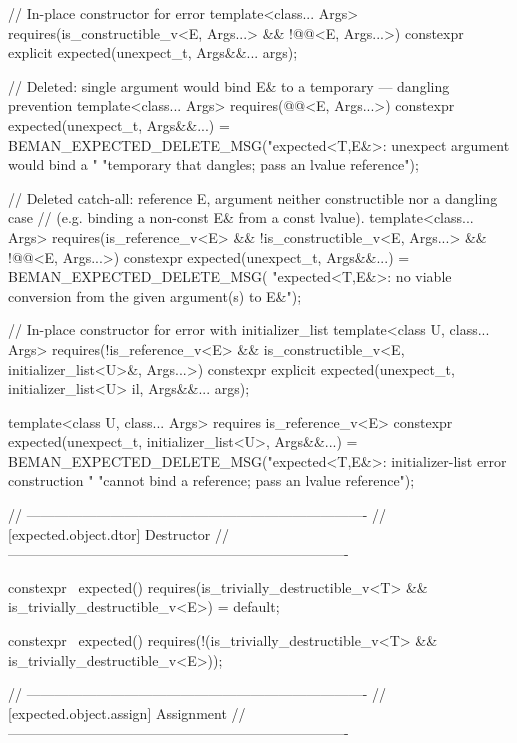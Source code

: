 \begin{codeblock}
{{    // In-place constructor for error
    template<class... Args>
      requires(is_constructible_v<E, Args...> && !@@<E, Args...>)
    constexpr explicit expected(unexpect_t, Args&&... args);

    // Deleted: single argument would bind E& to a temporary — dangling prevention
    template<class... Args>
      requires(@@<E, Args...>)
    constexpr expected(unexpect_t, Args&&...) =
        BEMAN_EXPECTED_DELETE_MSG("expected<T,E&>: unexpect argument would bind a "
                                  "temporary that dangles; pass an lvalue reference");

    // Deleted catch-all: reference E, argument neither constructible nor a dangling case
    // (e.g. binding a non-const E& from a const lvalue).
    template<class... Args>
      requires(is_reference_v<E> && !is_constructible_v<E, Args...> &&
               !@@<E, Args...>)
    constexpr expected(unexpect_t, Args&&...) = BEMAN_EXPECTED_DELETE_MSG(
        "expected<T,E&>: no viable conversion from the given argument(s) to E&");

    // In-place constructor for error with initializer_list
    template<class U, class... Args>
      requires(!is_reference_v<E> && is_constructible_v<E, initializer_list<U>&, Args...>)
    constexpr explicit expected(unexpect_t, initializer_list<U> il, Args&&... args);

    template<class U, class... Args>
      requires is_reference_v<E>
    constexpr expected(unexpect_t, initializer_list<U>, Args&&...) =
        BEMAN_EXPECTED_DELETE_MSG("expected<T,E&>: initializer-list error construction "
                                  "cannot bind a reference; pass an lvalue reference");

    // -------------------------------------------------------------------------
    // [expected.object.dtor] Destructor
    // -------------------------------------------------------------------------

    constexpr ~expected()
      requires(is_trivially_destructible_v<T> && is_trivially_destructible_v<E>)
    = default;

    constexpr ~expected()
      requires(!(is_trivially_destructible_v<T> && is_trivially_destructible_v<E>));

    // -------------------------------------------------------------------------
    // [expected.object.assign] Assignment
    // -------------------------------------------------------------------------

}}
\end{codeblock}
